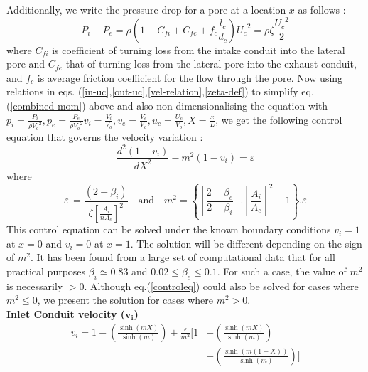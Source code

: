 \documentclass[twocolumn,10pt,cleanfoot]{ihmtc}
\begin{document}
%
Additionally, we write the pressure drop for a pore at a location
$x$ as follows : 
%
\begin{equation} \label{zeta-def}
{{P}_{i}}-{{P}_{e}}=\rho(1+{{C}_{fi}}+{{C}_{fe}}+{{f}_{c}}\frac{{{l}_{c}}}{{{d}_{c}}}){{U}_{c}}^{2}=\rho \zeta \frac{{{U}_{c}}^{2}}{2}
\end{equation}where $C_{fi}$ is coefficient of turning loss from the intake conduit
into the lateral pore and $C_{fe}$ that of turning loss from the
lateral pore into the exhaust conduit, and $f_c$ is average friction
coefficient for the flow through the pore.
%
Now using relations in eqs. (\ref{in-uc},\ref{out-uc},\ref{vel-relation},\ref{zeta-def})
to simplify eq. (\ref{combined-mom}) above and also non-dimensionalising
the equation with ${{p}_{i}}=\frac{{{P}_{i}}}{\rho{{V}_{o}}^{2}},{{p}_{e}}=\frac{{{P}_{e}}}{\rho{{V}_{o}}^{2}}{{v}_{i}}=\frac{{{V}_{i}}}{{{V}_{o}}},{{v}_{e}}=\frac{{{V}_{e}}}{{{V}_{o}}},{{u}_{c}}=\frac{{{U}_{c}}}{{{V}_{o}}},X=\frac{x}{L}$,
we get the following control equation that governs the velocity variation : 
%
\begin{equation} \label{controleq}
\frac{{{d}^{2}}(1-{{v}_{i}})}{d{{X}^{2}}}-{{m}^{2}}(1-{{v}_{i}})=\varepsilon
\end{equation}%
%
where 
%
\begin{equation} \label{msq}
\varepsilon\,=\frac{\left( 2-{{\beta }_{i}} \right)}{\zeta{{\left[\frac{{{A}_{i}}}{n{{A}_{c}}} \right]}^{2}}}\,\,\,\,\text{   and    }\,\,\,\,{{m}^{2}}=\left\{ \left[ \frac{2-{{\beta }_{e}}}{2-{{\beta }_{i}}} \right].{{\left[ \frac{{{A}_{i}}}{{{A}_{e}}} \right]}^{2}}-1 \right\}.\varepsilon
\end{equation}
%
%
This control equation can be solved under the known boundary conditions
$v_i=1$ at $x=0$ and $v_i=0$ at $x=1$. The solution will be different
depending on the sign of $m^2$. It has been found from a large set
of computational data that for all practical purposes $\beta_i\simeq0.83$
and $0.02 \leq \beta_e \leq 0.1$. For such a case, the value of $m^2$
is necessarily $>0$. Although eq.(\ref{controleq}) could also be solved for cases where $m^2\leq0$, we present the solution for cases
where $m^2>0$.\\
\textbf{Inlet Conduit velocity ($\bm{v_i}$)}
\begin{equation}\label{vi} 	
\begin{split}
{v}_{i}=1-\left( \frac{\sinh (mX)}{\sinh (m)} \right)+\frac{\varepsilon }{{m}^{2}}\Biggl[ 1 & - \left( \frac{\sinh (mX)}{\sinh (m)} \right) \\
& -\left( \frac{\sinh (m(1-X))}{\sinh (m)} \right) \Biggr]
\end{split}
\end{equation}
\end{document}
